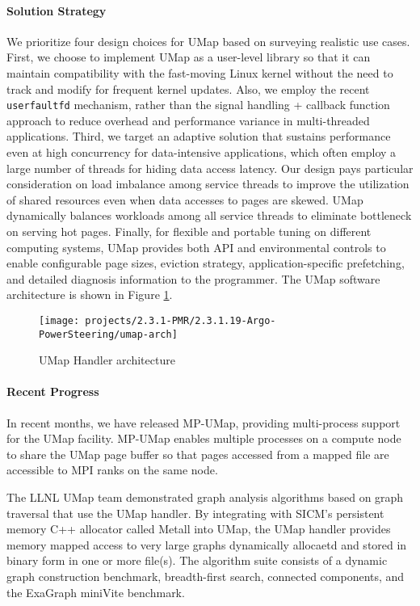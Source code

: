 \paragraph{Solution Strategy}

We prioritize four design choices for UMap based on surveying
realistic use cases. First, we choose to implement UMap as a
user-level library so that it can maintain compatibility with the
fast-moving Linux kernel without the need to track and modify for
frequent kernel updates. Also, we employ the recent \texttt{userfaultfd} 
mechanism, rather than the signal handling + callback function approach
to reduce overhead and performance variance in multi-threaded
applications. Third, we target an adaptive solution that sustains
performance even at high concurrency for data-intensive applications,
which often employ a large number of threads for hiding data access
latency. Our design pays particular consideration on load imbalance
among service threads to improve the utilization of shared resources
even when data accesses to pages are skewed. UMap dynamically balances
workloads among all service threads to eliminate bottleneck on serving
hot pages. Finally, for flexible and portable tuning on different
computing systems, UMap provides both API and environmental controls
to enable configurable page sizes, eviction strategy,
application-specific prefetching, and detailed diagnosis information to the
programmer. The UMap software architecture is shown in Figure
\ref{fig:umaparch}.

\begin{figure}[t]
        \centering
        \texttt{[image: projects/2.3.1-PMR/2.3.1.19-Argo-PowerSteering/umap-arch]}
        \caption{UMap Handler architecture}
        \label{fig:umaparch}
\end{figure}

\paragraph{Recent Progress}

In recent months, we have released MP-UMap, providing multi-process
support for the UMap facility. MP-UMap enables multiple processes on a
compute node to share the UMap page buffer so that pages accessed from
a mapped file are accessible to MPI ranks on the same node. 

The LLNL UMap team demonstrated graph analysis algorithms based on
graph traversal that use the UMap handler.  By integrating with SICM’s
persistent memory C++ allocator called Metall into UMap, the UMap
handler provides memory mapped access to very large graphs dynamically
allocaetd and stored in binary form in one or more file(s). The
algorithm suite consists of a dynamic graph construction benchmark,
breadth-first search, connected components, and the ExaGraph miniVite
benchmark.

